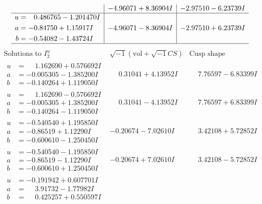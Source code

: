 \documentclass[1p]{elsarticle_modified}
\theoremstyle{definition}
\newcommand{\I}{\sqrt{-1}}
\begin{document}
$$\begin{array}{c|c|c}
 & -4.96071 + 8.36904 I & -2.97510 - 6.23739 I \\ \hline\begin{aligned}
u &= \phantom{-}0.486765 - 1.201470 I \\
a &= -0.84750 + 1.15917 I \\
b &= -0.54082 - 1.43724 I\end{aligned}
 & -4.96071 - 8.36904 I & -2.97510 + 6.23739 I\\
 \hline 
 \end{array}$$\newpage$$\begin{array}{c|c|c}  
\text{Solutions to }I^u_{2}& \I (\text{vol} + \sqrt{-1}CS) & \text{Cusp shape}\\
 \hline 
\begin{aligned}
u &= \phantom{-}1.162690 + 0.576692 I \\
a &= -0.005305 - 1.385200 I \\
b &= -0.140264 + 1.119050 I\end{aligned}
 & \phantom{-}0.31041 + 4.13952 I & \phantom{-}7.76597 - 6.83399 I \\ \hline\begin{aligned}
u &= \phantom{-}1.162690 - 0.576692 I \\
a &= -0.005305 + 1.385200 I \\
b &= -0.140264 - 1.119050 I\end{aligned}
 & \phantom{-}0.31041 - 4.13952 I & \phantom{-}7.76597 + 6.83399 I \\ \hline\begin{aligned}
u &= -0.540540 + 1.195850 I \\
a &= -0.86519 + 1.12290 I \\
b &= -0.600610 - 1.250450 I\end{aligned}
 & -0.20674 - 7.02610 I & \phantom{-}3.42108 + 5.72852 I \\ \hline\begin{aligned}
u &= -0.540540 - 1.195850 I \\
a &= -0.86519 - 1.12290 I \\
b &= -0.600610 + 1.250450 I\end{aligned}
 & -0.20674 + 7.02610 I & \phantom{-}3.42108 - 5.72852 I \\ \hline\begin{aligned}
u &= -0.191942 + 0.607701 I \\
a &= \phantom{-}3.91732 - 1.77982 I \\
b &= \phantom{-}0.425257 + 0.550597 I\end{aligned}

\end{array}$$
\end{document}

